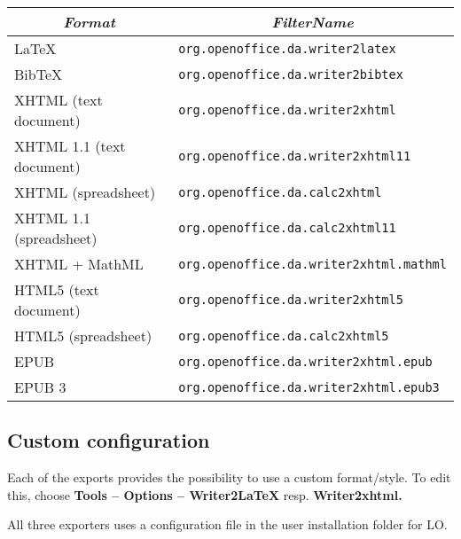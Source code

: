 \documentclass{article}
\newcommand\textstyleSourceText[1]{\texttt{\textmd{#1}}}
\begin{document}
\begin{center}
\begin{tabular}{|l|l|}

\hline
\multicolumn{1}{|c|}{\bfseries\itshape Format} & \multicolumn{1}{c|}{\bfseries\itshape FilterName}\\\hline
LaTeX & \textstyleSourceText{org.openoffice.da.writer2latex}\\\hline
BibTeX & \textstyleSourceText{org.openoffice.da.writer2bibtex}\\\hline
XHTML (text document) & \textstyleSourceText{org.openoffice.da.writer2xhtml}\\\hline
XHTML 1.1 (text document) & \textstyleSourceText{org.openoffice.da.writer2xhtml11}\\\hline
XHTML (spreadsheet) & \textstyleSourceText{org.openoffice.da.calc2xhtml}\\\hline
XHTML 1.1 (spreadsheet) & \textstyleSourceText{org.openoffice.da.calc2xhtml11}\\\hline
XHTML + MathML & \textstyleSourceText{org.openoffice.da.writer2xhtml.mathml}\\\hline
HTML5 (text document) & \textstyleSourceText{org.openoffice.da.writer2xhtml5}\\\hline
HTML5 (spreadsheet) & \textstyleSourceText{org.openoffice.da.calc2xhtml5}\\\hline
EPUB & \textstyleSourceText{org.openoffice.da.writer2xhtml.epub}\\\hline
EPUB 3 & \textstyleSourceText{org.openoffice.da.writer2xhtml.epub3}\\\hline
\end{tabular}
\end{center}
\subsection{Custom configuration}
\label{ref:customconfig}{\mdseries
Each of the exports provides the possibility to use a custom format/style. To edit this, choose \textbf{Tools -- Options -- Writer2LaTeX} resp. \textbf{Writer2xhtml.} }

{\mdseries
All three exporters uses a configuration file in the user installation folder for LO.}
\end{document}
